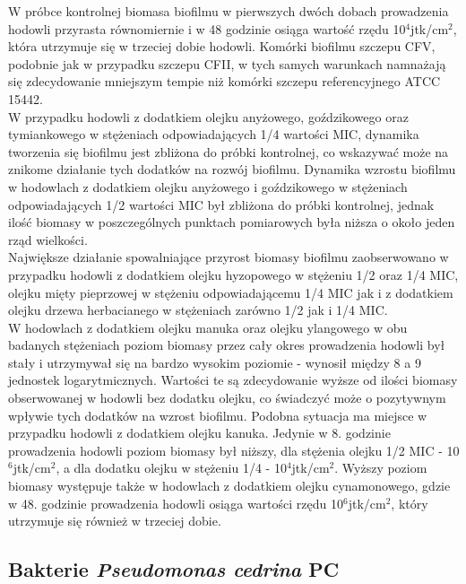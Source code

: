 \documentclass[11pt,a4paper]{report}
\begin{document}
W próbce kontrolnej biomasa biofilmu w pierwszych dwóch dobach prowadzenia hodowli przyrasta równomiernie i w 48 godzinie osiąga wartość rzędu 10$^4$jtk/cm$^2$, która utrzymuje się w trzeciej dobie hodowli. Komórki biofilmu szczepu CFV, podobnie jak w przypadku szczepu CFII, w tych samych warunkach namnażają się zdecydowanie mniejszym tempie niż komórki szczepu referencyjnego ATCC 15442.\\
W przypadku hodowli z dodatkiem olejku anyżowego, goździkowego oraz tymiankowego w stężeniach odpowiadających 1/4 wartości MIC, dynamika tworzenia się biofilmu jest zbliżona do próbki kontrolnej, co wskazywać może na znikome działanie tych dodatków na rozwój biofilmu.
Dynamika wzrostu biofilmu w hodowlach z dodatkiem olejku anyżowego i goździkowego w stężeniach odpowiadających 1/2 wartości MIC był zbliżona do próbki kontrolnej, jednak ilość biomasy w poszczególnych punktach pomiarowych była niższa o około jeden rząd wielkości.\\
Największe działanie spowalniające przyrost biomasy biofilmu zaobserwowano w przypadku hodowli z dodatkiem olejku hyzopowego w stężeniu 1/2 oraz 1/4 MIC, olejku mięty pieprzowej w stężeniu odpowiadającemu 1/4 MIC jak i z dodatkiem olejku drzewa herbacianego w stężeniach zarówno 1/2 jak i 1/4 MIC.\\
W hodowlach z dodatkiem olejku manuka oraz olejku ylangowego w obu badanych stężeniach poziom biomasy przez cały okres prowadzenia hodowli był stały i utrzymywał się na bardzo wysokim poziomie - wynosił między 8 a 9 jednostek logarytmicznych. Wartości te są zdecydowanie wyższe od ilości biomasy obserwowanej w hodowli bez dodatku olejku, co świadczyć może o pozytywnym wpływie tych dodatków na wzrost biofilmu.
Podobna sytuacja ma miejsce w przypadku hodowli z dodatkiem olejku kanuka. Jedynie w 8. godzinie prowadzenia hodowli poziom biomasy był niższy, dla stężenia olejku 1/2 MIC - 10$^6$jtk/cm$^2$, a dla dodatku olejku w stężeniu 1/4 - 10$^4$jtk/cm$^2$.
Wyższy poziom biomasy występuje także w hodowlach z dodatkiem olejku cynamonowego, gdzie w 48. godzinie prowadzenia hodowli osiąga wartości rzędu 10$^6$jtk/cm$^2$, który utrzymuje się również w trzeciej dobie.
\clearpage

\subsection{Bakterie \textit{Pseudomonas cedrina} PC}
\end{document}
